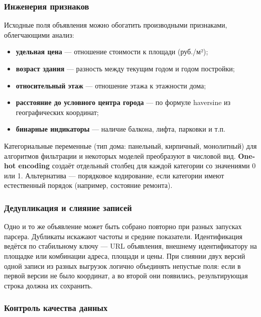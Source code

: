 \subsubsection{Инженерия признаков}

Исходные поля объявления можно обогатить производными признаками, облегчающими анализ:
\begin{itemize}
    \item \textbf{удельная цена} --- отношение стоимости к площади (руб./м²);
    \item \textbf{возраст здания} --- разность между текущим годом и годом постройки;
    \item \textbf{относительный этаж} --- отношение этажа к этажности дома;
    \item \textbf{расстояние до условного центра города} --- по формуле haversine из географических координат;
    \item \textbf{бинарные индикаторы} --- наличие балкона, лифта, парковки и т.п.
\end{itemize}

Категориальные переменные (тип дома: панельный, кирпичный, монолитный) для алгоритмов фильтрации и некоторых моделей преобразуют в числовой вид. \textbf{One-hot encoding} создаёт отдельный столбец для каждой категории со значениями 0 или 1. Альтернатива --- порядковое кодирование, если категории имеют естественный порядок (например, состояние ремонта).

\subsubsection{Дедупликация и слияние записей}

Одно и то же объявление может быть собрано повторно при разных запусках парсера. Дубликаты искажают частоты и средние показатели. Идентификация ведётся по стабильному ключу --- URL объявления, внешнему идентификатору на площадке или комбинации адреса, площади и цены. При слиянии двух версий одной записи из разных выгрузок логично объединять непустые поля: если в первой версии не было координат, а во второй они появились, результирующая строка должна их сохранить.

\subsubsection{Контроль качества данных}

